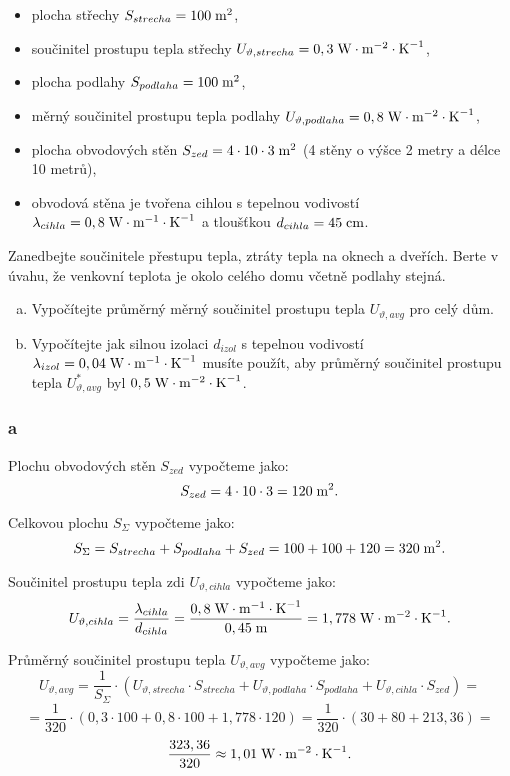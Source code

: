 \documentclass{article}
\begin{document}
\begin{itemize}
    \item plocha střechy $S_{strecha} = 100 \; \textrm{m}^{\textrm{2}}$,
    \item součinitel prostupu tepla střechy $U_{\vartheta,strecha} = 0,3 \; \textrm{W} \cdot \textrm{m}^{-2} \cdot \textrm{K}^{-1}$,
    \item plocha podlahy $S_{podlaha} = 100 \; \textrm{m}^{\textrm{2}}$,
    \item měrný součinitel prostupu tepla podlahy $U_{\vartheta,podlaha} = 0,8 \; \textrm{W} \cdot \textrm{m}^{-2} \cdot \textrm{K}^{-1}$,
    \item plocha obvodových stěn $S_{zed} = 4 \cdot 10 \cdot 3 \; \textrm{m}^{\textrm{2}}$ (4 stěny o výšce 2 metry a délce 10 metrů),
    \item obvodová stěna je tvořena cihlou s tepelnou vodivostí $\lambda_{cihla} = 0,8 \; \textrm{W} \cdot \textrm{m}^{-1} \cdot \textrm{K}^{-1}$ a tloušťkou $d_{cihla} = 45 \; \textrm{cm}$.
\end{itemize}

Zanedbejte součinitele přestupu tepla, ztráty tepla na oknech a dveřích. Berte v úvahu, že venkovní teplota je okolo celého domu včetně podlahy stejná.

\begin{enumerate}[a)]
    \item Vypočítejte průměrný měrný součinitel prostupu tepla $U_{\vartheta,avg}$ pro celý dům.
    \item Vypočítejte jak silnou izolaci $d_{izol}$ s tepelnou vodivostí $\lambda_{izol} = 0,04 \; \textrm{W} \cdot \textrm{m}^{-1} \cdot \textrm{K}^{-1}$ musíte použít, aby průměrný součinitel prostupu tepla $U_{\vartheta,avg}^{*}$ byl $0,5 \; \textrm{W} \cdot \textrm{m}^{-2} \cdot \textrm{K}^{-1}$.
\end{enumerate}


\subsubsection{a}
Plochu obvodových stěn $S_{zed}$ vypočteme jako:
$$
    S_{zed} = 4 \cdot 10 \cdot 3 = 120 \; \textrm{m}^{\textrm{2}}.
$$

Celkovou plochu $S_{\Sigma}$ vypočteme jako:
$$
    S_{\Sigma} = S_{strecha} + S_{podlaha} + S_{zed} = 100 + 100 + 120 = 320 \; \textrm{m}^{\textrm{2}}.
$$

Součinitel prostupu tepla zdi $U_{\vartheta,cihla}$ vypočteme jako:
$$
    U_{\vartheta,cihla} = \frac{\lambda_{cihla}}{d_{cihla}} = \frac{0,8 \; \textrm{W} \cdot \textrm{m}^{-1} \cdot \textrm{K}^{-1}}{0,45 \; \textrm{m}} = 1,778 \; \textrm{W} \cdot \textrm{m}^{-2} \cdot \textrm{K}^{-1}.
$$

Průměrný součinitel prostupu tepla $U_{\vartheta,avg}$ vypočteme jako:
$$
    U_{\vartheta,avg} = \frac{1}{S_{\Sigma}} \cdot (U_{\vartheta,strecha} \cdot S_{strecha} + U_{\vartheta,podlaha} \cdot S_{podlaha} + U_{\vartheta,cihla} \cdot S_{zed}) =
$$
$$
    = \frac{1}{320} \cdot \left( 0,3 \cdot 100 + 0,8 \cdot 100 + 1,778 \cdot 120 \right) = \frac{1}{320} \cdot (30 + 80 + 213,36) =
$$
$$
    \frac{323,36}{320} \approx 1,01 \; \textrm{W} \cdot \textrm{m}^{-2} \cdot \textrm{K}^{-1}.
$$
\end{document}
